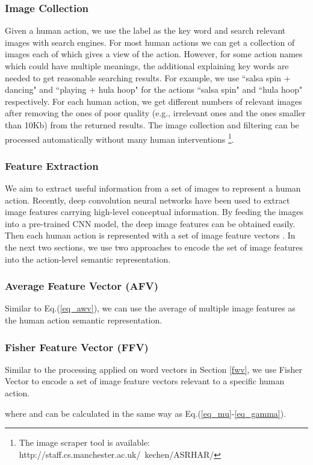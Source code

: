\documentclass[runningheads,a4paper] {llncs}
\begin{document}
\subsubsection{Image Collection}
Given a human action, we use the label as the key word and search relevant images with search engines. For most human actions we can get a collection of images each of which gives a view of the action. However, for some action names which could have multiple meanings, the additional explaining key words are needed to get reasonable searching results. For example, we use ``salsa spin + dancing" and ``playing + hula hoop" for the actions ``salsa spin" and ``hula hoop" respectively. For each human action, we get different numbers of relevant images after removing the ones of poor quality (e.g., irrelevant ones and the ones smaller than 10Kb) from the returned results. The image collection and filtering can be processed automatically without many human interventions \footnote{The image scraper tool is available: http://staff.cs.manchester.ac.uk/~kechen/ASRHAR/}.
\subsubsection{Feature Extraction}
We aim to extract useful information from a set of images to represent a human action. Recently, deep convolution neural networks have been used to extract image features carrying high-level conceptual information. By feeding the images into a pre-trained CNN model, the deep image features can be obtained easily. Then each human action is represented with a set of image feature vectors . In the next two sections, we use two approaches to encode the set of image features into the action-level semantic representation.
\subsubsection{Average Feature Vector (AFV)}
Similar to Eq.(\ref{eq_awv}), we can use the average of multiple image features as the human action semantic representation.

\subsubsection{Fisher Feature Vector (FFV)}
Similar to the processing applied on word vectors in Section \ref{fwv}, we use Fisher Vector to encode a set of image feature vectors relevant to a specific human action.

where  and  can be calculated in the same way as Eq.(\ref{eq_mu}-\ref{eq_gamma}).
\end{document}
